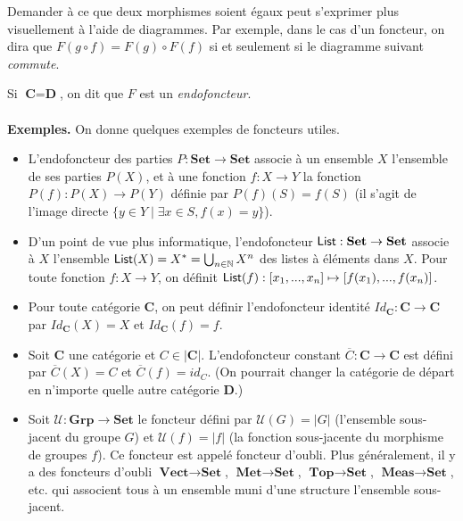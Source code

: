 \documentclass[11pt,a4paper]{article}
\newcommand{\gr}{\textbf}
\newcommand{\il}{\textit}
\newcommand{\N}{\mathbb{N}}
\newcommand{\U}{\mathcal{U}}
\newcommand{\info}[1]{\text{{\fontfamily{lmss}\selectfont #1}}}
\begin{document}
Demander à ce que deux morphismes soient égaux peut s'exprimer plus visuellement à l'aide de diagrammes. Par exemple, dans le cas d'un foncteur, on dira que $F(g \circ f) = F(g) \circ F(f)$ si et seulement si le diagramme suivant \il{commute}.
\begin{center}
\end{center}
Si $\gr{C} = \gr{D}$, on dit que $F$ est un \il{endofoncteur}.\\\\
\gr{Exemples.} On donne quelques exemples de foncteurs utiles.\begin{itemize}
\setlength\itemsep{-0.3em}
\item L'endofoncteur des parties $P : \gr{Set} \to \gr{Set}$ associe à un ensemble $X$ l'ensemble de ses parties $P(X)$, et à une fonction $f : X \to Y$ la fonction $P(f) : P(X) \to P(Y)$ définie par $P(f)(S) = f(S)$ (il s'agit de l'image directe $\{ y \in Y \mid \exists x \in S, f(x) = y \}$).
\item D'un point de vue plus informatique, l'endofoncteur $\info{List} : \gr{Set} \to \gr{Set}$ associe à $X$ l'ensemble $\info{List}(X) = X^* = \bigcup_{n\in \N} X^n$ des listes à éléments dans $X$. Pour toute fonction $f : X \to Y$, on définit $\info{List}(f) : [x_1,...,x_n] \mapsto [f(x_1),...,f(x_n)]$.
\item Pour toute catégorie $\gr{C}$, on peut définir l'endofoncteur identité $Id_\gr{C} : \gr{C} \to \gr{C}$ par $Id_\gr{C}(X) = X$ et $Id_\gr{C}(f) = f$.
\item Soit $\gr{C}$ une catégorie et $C \in |\gr{C}|$. L'endofoncteur constant $\overline{C} : \gr{C} \to \gr{C}$ est défini par $\overline{C}(X) = C$ et $\overline{C}(f) = id_C$. (On pourrait changer la catégorie de départ en n'importe quelle autre catégorie $\gr{D}$.)
\item Soit $\U : \gr{Grp} \to \gr{Set}$ le foncteur défini par $\U(G) = |G|$ (l'ensemble sous-jacent du groupe $G$) et $\U(f) = |f|$ (la fonction sous-jacente du morphisme de groupes $f$). Ce foncteur est appelé foncteur d'oubli. Plus généralement, il y a des foncteurs d'oubli $\gr{Vect} \to \gr{Set}$, $\gr{Met} \to \gr{Set}$, $\gr{Top} \to \gr{Set}$, $\gr{Meas} \to \gr{Set}$, etc. qui associent tous à un ensemble muni d'une structure l'ensemble sous-jacent.
\end{itemize}
\end{document}
